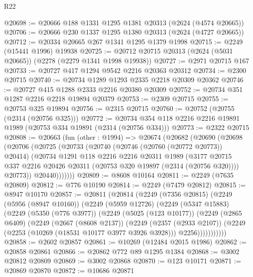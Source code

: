 \begin{lexlean}{R22}
\begin{coremodule}
@20698 := @20666 @188 @1331 @1295 @1381 @20313 (@2624 (@4574 @20665))
@20706 := @20666 @230 @1337 @1295 @1380 @20313 (@2624 (@4727 @20665))
@20712 := @20334 @20665 @267 @1341 @1295 @1379 @1998
@20715 := @2249 (@15441 @1996) @19938
@20725 := @20712 @20715 @20313 (@2624 (@5031 @20665)) (@2278 (@2279 @1341 @1998 @19938))
@20727 := @2971 @20715 @167
@20733 := @20727 @417 @1294 @9542 @2216 @20363 @20312
@20734 := @2300 @20715
@20740 := @20734 @1289 @1293 @2335 @2218 @20309 @20362
@20746 := @20727 @415 @1288 @2333 @2216 @20380 @20309
@20752 := @20734 @351 @1287 @2216 @2218 @19894 @20379
@20753 := @2309 @20715
@20755 := @20753 @325 @19894
@20756 := @2315 @20715
@20760 := @20752 (@20755 (@2314 (@20756 @325)))
@20772 := @20734 @354 @118 @2216 @2216 @19891 @1989 (@20753 @334 @19891 (@2314 (@20756 @334)))
@20773 := @2322 @20715
@20808 := @20663
    (fun (other : @1994) =>
    @20674
      (@20682
        (@20690
          (@20698
            (@20706
              (@20725
                (@20733
                  (@20740
                    (@20746 (@20760 (@20772 @20773)) @20414)
                    (@20734
                      @1291
                      @118
                      @2216
                      @2216
                      @20311
                      @1989
                      (@3177
                        @20715
                        @337
                        @2216
                        @20426
                        @20311
                        (@20753 @320 @19897 (@2314 (@20756 @320))))
                      @20773))
                  @20440)))))))
@20809 := @8608 @10164
@20811 := @2249 (@7635 @20809)
@20812 := @776 @10190
@20814 := @2249 (@7479 @20812)
@20815 := @8947 @10170
@20857 := @20811
    (@20814
      (@2249
        (@7356 @20815)
        (@2249
          (@5956 (@8947 @10160))
          (@2249
            (@5959 @12726)
            (@2249
              (@5347 @15883)
              (@2249
                (@5350 (@776 @3977))
                (@2249
                  (@5025 (@123 @10177))
                  (@2249
                    (@2865 @6409)
                    (@2249
                      (@2667 (@8608 @2137))
                      (@2249
                        (@2357 (@2933 @2107))
                        (@2249 (@2253 (@10269 (@18531 @10177 @3977 @3926 @3928))) @2256)))))))))))
@20858 := @2602 @20857
@20861 := @10269 (@12484 @2015 @1986)
@20862 := @20858 @20861
@20866 := @20862 @772 @89 @1295 @1384
@20868 := @3002 @20812 @20809
@20869 := @3002 @20868
@20870 := @123 @10171
@20871 := @20869 @20870
@20872 := @10686 @20871

\end{coremodule}
\end{lexlean}

